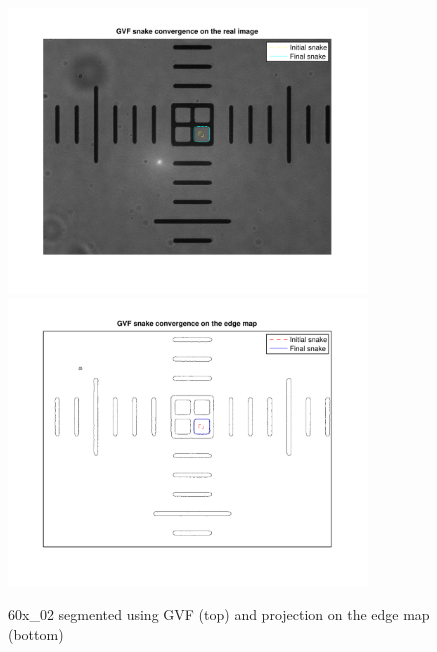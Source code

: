 \documentclass{article}
\begin{document}
\begin{figure}
\centering
\includegraphics[width=0.85\textwidth]{figures/gvf_1p2.pdf}
\includegraphics[width=0.85\textwidth]{figures/gvf_1p2_edge.pdf}
\caption{60x\_02 segmented using GVF (top) and projection on the edge map (bottom)}
\label{fig:gvf1p2}
\end{figure}
\end{document}
